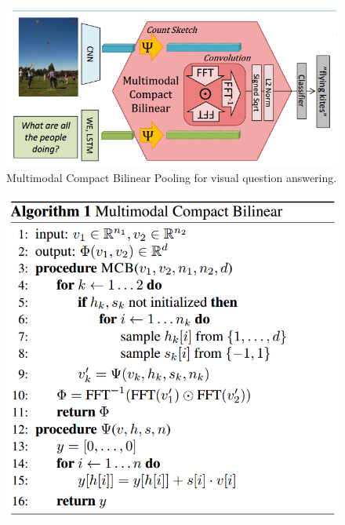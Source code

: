 \documentclass{article}
\begin{document}
    \begin{figure}[ht]
    	\centering
            \includegraphics[width=0.5\linewidth]{mcb.PNG}
    	\caption{Multimodal Compact Bilinear Pooling for visual question answering.}
    	\label{mcb}
    \end{figure}
    \begin{figure}[ht]
    	\centering
            \includegraphics[width=0.5\linewidth]{mcbAlgo.PNG}
    	\label{mcbAlgo}
    \end{figure}
\end{document}
